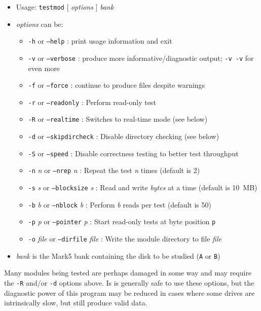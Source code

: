 \begin{itemize}
\item[] Usage: {\tt testmod} $[$ {\em options} $]$ {\em bank}
\item[] {\em options} can be:
\begin{itemize}
\item[] {\tt -h} or {\tt --help} : print usage information and exit
\item[] {\tt -v} or {\tt --verbose} : produce more informative/diagnostic output; {\tt -v -v} for even more
\item[] {\tt -f} or {\tt --force} : continue to produce files despite warnings
\item[] {\tt -r} or {\tt --readonly} : Perform read-only test
\item[] {\tt -R} or {\tt --realtime} : Switches to real-time mode (see below)
\item[] {\tt -d} or {\tt --skipdircheck} : Disable directory checking (see below)
\item[] {\tt -S} or {\tt --speed} : Disable correctness testing to better test throughput
\item[] {\tt -n} {\em n} or {\tt --nrep} {\em n} : Repeat the test {\em n} times (default is 2)
\item[] {\tt -s} {\em s} or {\tt --blocksize} {\em s} : Read and write {\em bytes} at a time (default is 10~MB)
\item[] {\tt -b} {\em b} or {\tt --nblock} {\em b} : Perform {\em b} reads per test (default is 50)
\item[] {\tt -p} {\em p} or {\tt --pointer} {\em p} : Start read-only tests at byte position {\tt p}
\item[] {\tt -o} {\em file} or {\tt --dirfile} {\em file} : Write the module directory to file {\em file}
\end{itemize}
\item[] {\em bank} is the Mark5 bank containing the disk to be studied ({\tt A} or {\tt B})
\end{itemize}

Many modules being tested are perhaps damaged in some way and may require the {\tt -R} and/or {\tt -d} options above.
Is is generally safe to use these options, but the diagnostic power of this program may be reduced in cases where some drives are intrinsically slow, but still produce valid data.





